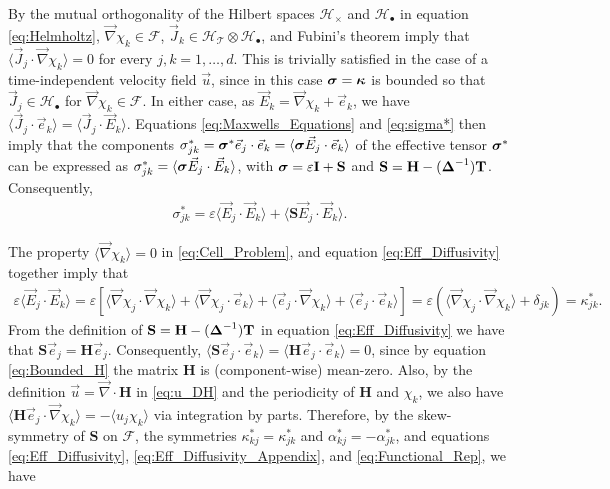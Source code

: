 \documentclass[11pt]{amsart}
\newcommand{\Tb}{\mathbf{T}}
\newcommand{\Hb}{\mathbf{H}}
\newcommand{\Ib}{\mathbf{I}}
\newcommand{\Sb}{\mathbf{S}}
\newcommand{\Tc}{\mathcal{T}}
\newcommand{\Hs}{\mathscr{H}}
\newcommand{\Fs}{\mathscr{F}}
\newcommand\bsig{\mbox{\boldmath${\sigma}$}}
\newcommand\bDelta{\mbox{\boldmath${\Delta}$}}
\newcommand\bkappa{\mbox{\boldmath${\kappa}$}}
\begin{document}
By the mutual orthogonality of the Hilbert spaces $\Hs_\times$ and $\Hs_\bullet$
in equation \eqref{eq:Helmholtz}, 
$\vec{\nabla}\chi_k\in\Fs$, $\vec{J}_k\in\Hs_{\Tc}\otimes\Hs_\bullet$, and Fubini's theorem
\cite{Folland:99} imply that $\langle\vec{J}_j\cdot\vec{\nabla}\chi_k\rangle=0$ for every
$j,k=1,\ldots,d$. This is trivially 
satisfied in the case of a time-independent velocity field $\vec{u}$,
since in this case $\bsig=\bkappa$ is bounded so that
$\vec{J}_j\in\Hs_\bullet$ for $\vec{\nabla}\chi_k\in\Fs$. In either case, as
$\vec{E}_k=\vec{\nabla}\chi_k+\vec{e}_k$, we have
$\langle\vec{J}_j\cdot\vec{e}_k\rangle=\langle\vec{J}_j\cdot\vec{E}_k\rangle$. Equations
\eqref{eq:Maxwells_Equations} and \eqref{eq:sigma*} then imply that
the components
$\sigma^*_{jk}=\bsig^*\vec{e}_j\cdot\vec{e}_k=\langle\bsig\vec{E}_j\cdot\vec{e}_k\rangle$ of 
the effective tensor $\bsig^*$ can be expressed as
$\sigma^*_{jk}=\langle\bsig\vec{E}_j\cdot\vec{E}_k\rangle$, with $\bsig=\varepsilon\Ib+\Sb$ and
$\Sb=\Hb-(\bDelta^{-1})\Tb$. Consequently,      
%
\begin{align}\label{eq:Reduction}
  \sigma^*_{jk} %
       =\varepsilon\langle\vec{E}_j\cdot\vec{E}_k\rangle+\langle\Sb\vec{E}_j\cdot\vec{E}_k\rangle.      
\end{align}
%




The property  $\langle\vec{\nabla}\chi_k\rangle=0$ in \eqref{eq:Cell_Problem}, and equation
\eqref{eq:Eff_Diffusivity} together imply that 
%
\begin{align}\label{eq:Reduction_kappa}
  \varepsilon\langle\vec{E}_j\cdot\vec{E}_k\rangle=\varepsilon[\langle\vec{\nabla}\chi_j\cdot\vec{\nabla}\chi_k\rangle
                   +\langle\vec{\nabla}\chi_j\cdot\vec{e}_k\rangle+\langle\vec{e}_j\cdot\vec{\nabla}\chi_k\rangle
                   +\langle\vec{e}_j\cdot\vec{e}_k\rangle]
                   =\varepsilon(\langle\vec{\nabla}\chi_j\cdot\vec{\nabla}\chi_k\rangle+\delta_{jk})
                   =\kappa^*_{jk}. 
\end{align}
%
From the definition of $\Sb=\Hb-(\bDelta^{-1})\Tb$ in equation
\eqref{eq:Eff_Diffusivity} we have that
$\Sb\vec{e}_j=\Hb\vec{e}_j$. Consequently,
$\langle\Sb\vec{e}_j\cdot\vec{e}_k\rangle=\langle\Hb\vec{e}_j\cdot\vec{e}_k\rangle=0$, since by 
equation \eqref{eq:Bounded_H} the matrix $\Hb$ is (component-wise)
mean-zero. Also, by the definition $\vec{u}=\vec{\nabla}\cdot\Hb$ in
\eqref{eq:u_DH} and the periodicity of $\Hb$ and $\chi_k$, we also have
$\langle\Hb\vec{e}_j\cdot\vec{\nabla}\chi_k\rangle=-\langle u_j\chi_k\rangle$ via integration by
parts. Therefore, by the skew-symmetry of $\Sb$ on $\Fs$, the
symmetries $\kappa^*_{kj}=\kappa^*_{jk}$ and $\alpha^*_{kj}=-\alpha^*_{jk}$, and equations
\eqref{eq:Eff_Diffusivity}, \eqref{eq:Eff_Diffusivity_Appendix}, and
\eqref{eq:Functional_Rep}, we have 
\end{document}
